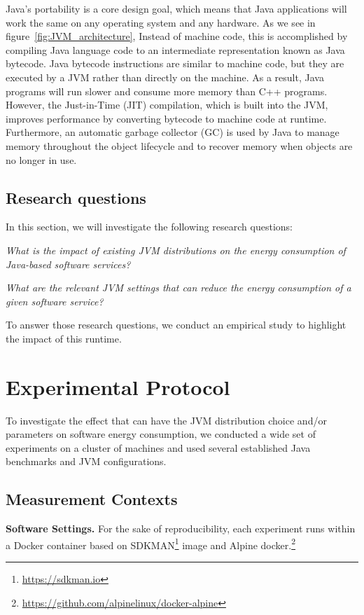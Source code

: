 Java's portability is a core design goal, which means that Java applications will work the same on any operating system and any hardware. As we see in figure~\ref{fig:JVM_architecture}, Instead of machine code, this is accomplished by compiling Java language code to an intermediate representation known as Java bytecode. Java bytecode instructions are similar to machine code, but they are executed by a JVM rather than directly on the machine. As a result, Java programs will run slower and consume more memory than C++ programs. However, the Just-in-Time (JIT) compilation, which is built into the JVM, improves performance by converting bytecode to machine code at runtime. Furthermore, an automatic garbage collector (GC) is used by Java to manage memory throughout the object lifecycle and to recover memory when objects are no longer in use.

\subsection{Research questions}
In this section, we will investigate the following research questions:
\begin{compactenum}[\indent\bf RQ\,1:]
    \item \emph{What is the impact of existing JVM distributions on the energy consumption of Java-based software services?}
    \item \emph{What are the relevant JVM settings that can reduce the energy consumption of a given software service?}
\end{compactenum}

To answer those research questions, we conduct an empirical study to highlight the impact of this runtime.

\section{Experimental Protocol}\label{sec:javaprotocol}
To investigate the effect that can have the JVM distribution choice and/or parameters on software energy consumption, we conducted a wide set of experiments on a cluster of machines and used several established Java benchmarks and JVM configurations.

\subsection{Measurement Contexts}

\noindent\textbf{Software Settings.}
For the sake of reproducibility, each experiment runs within a Docker container based on \textsf{SDKMAN}\footnote{\url{https://sdkman.io}} image and Alpine docker.\footnote{\url{https://github.com/alpinelinux/docker-alpine}}

